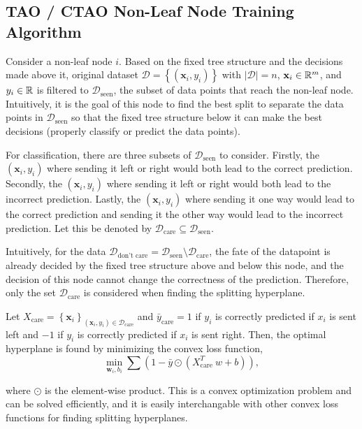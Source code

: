 \documentclass{article}
\begin{document}
\subsection{TAO / CTAO Non-Leaf Node Training Algorithm}

Consider a non-leaf node $i$. Based on the fixed tree structure and the decisions made above it, original dataset $\mathcal{D} = \left\{ (\mathbf{x}_i, y_i) \right\}$ with $|\mathcal{D}| = n$, $\mathbf{x}_i \in \mathbb{R}^m$, and $y_i \in \mathbb{R}$
is filtered to $\mathcal{D}_\text{seen}$, the subset of data points that reach the non-leaf node. Intuitively, it is the goal of this node to find the best split to separate the data points in $\mathcal{D}_\text{seen}$
so that the fixed tree structure below it can make the best decisions (properly classify or predict the data points).

For classification, there are three subsets of $\mathcal{D}_\text{seen}$ to consider. Firstly, the $(\mathbf{x}_i, y_i)$ where sending it left or right would both lead to the correct prediction.
Secondly, the $(\mathbf{x}_i, y_i)$ where sending it left or right would both lead to the incorrect prediction. 
Lastly, the $(\mathbf{x}_i, y_i)$ where sending it one way would lead to the correct prediction and sending it the other way would lead to the incorrect prediction. 
Let this be denoted by $\mathcal{D}_\text{care} \subseteq \mathcal{D}_\text{seen}$.

Intuitively, for the data $\mathcal{D}_\text{don't care} = \mathcal{D}_\text{seen} \setminus \mathcal{D}_\text{care}$, the fate of the datapoint is already decided by the fixed tree structure above and below this node,
and the decision of this node cannot change the correctness of the prediction. Therefore, only the set $\mathcal{D}_\text{care}$ is considered when finding the splitting hyperplane.

Let $X_\text{care} = \left\{ \mathbf{x}_i \right\}_{(\mathbf{x}_i, y_i) \in \mathcal{D}_\text{care}}$ and $\bar{y}_\text{care} = 1$ if $y_i$ is correctly predicted if $x_i$ is sent left and $-1$ if $y_i$ is correctly predicted if $x_i$ is sent right.
Then, the optimal hyperplane is found by minimizing the convex loss function,
\begin{equation*}
  \min_{\mathbf{w}_i, b_i} \sum\left(1-\bar{y} \odot\left(X_{\text {care }}^T w+b\right)\right),
\end{equation*}

where $\odot$ is the element-wise product. This is a convex optimization problem and can be solved efficiently, and it is easily interchangable with other convex loss functions for finding splitting hyperplanes.
\end{document}
